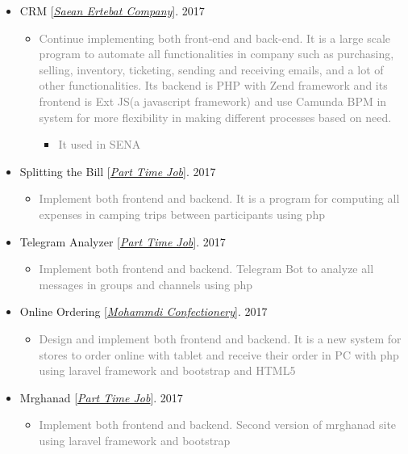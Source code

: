 \documentclass[10pt,a4paper,sans]{moderncv} %
\begin{document}
\begin{itemize}
		\item CRM [\href{http://www.senatelecom.com/}{\emph{Saean Ertebat Company}}]. \hfill 2017
		\begin{itemize}
			\item \textcolor{gray} {Continue implementing both front-end and back-end. It is a large scale program to automate all functionalities in company such as purchasing, selling, inventory, ticketing, sending and receiving emails, and a lot of other functionalities. Its backend is PHP with Zend framework and its frontend is Ext JS(a javascript framework) and use Camunda BPM in system for more flexibility in making different processes based on need.}
			\begin{itemize}
				\item \textcolor{gray} {It used in SENA}
			\end{itemize}
		\end{itemize}

		\item Splitting the Bill [\href{mailto:ma.mohammadizadeh@gmail.com}{\emph{Part Time Job}}]. \hfill 2017
		\begin{itemize}
			\item \textcolor{gray} {Implement both frontend and backend. It is a program for computing all expenses in camping trips between participants using php}
		\end{itemize}

		\item Telegram Analyzer [\href{mailto:ma.mohammadizadeh@gmail.com}{\emph{Part Time Job}}]. \hfill 2017
		\begin{itemize}
			\item \textcolor{gray} {Implement both frontend and backend. Telegram Bot to analyze all messages in groups and channels using php}
		\end{itemize}

		\item Online Ordering [\href{http://#/}{\emph{Mohammdi Confectionery}}]. \hfill 2017
		\begin{itemize}
			\item \textcolor{gray} {Design and implement both frontend and backend. It is a new system for stores to order online with tablet and receive their order in PC with php using laravel framework and bootstrap and HTML5}
		\end{itemize}

		\item Mrghanad [\href{mailto:ma.mohammadizadeh@gmail.com}{\emph{Part Time Job}}]. \hfill 2017
		\begin{itemize}
			\item \textcolor{gray} {Implement both frontend and backend. Second version of mrghanad site using laravel framework and bootstrap}
		\end{itemize}


\end{itemize}
\end{document}
